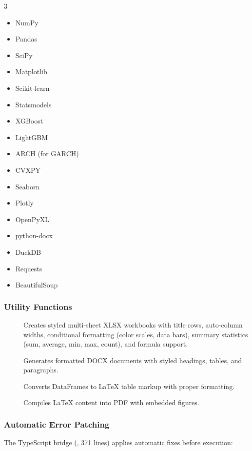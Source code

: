 \begin{multicols}{3}
\begin{itemize}
  \item NumPy
  \item Pandas
  \item SciPy
  \item Matplotlib
  \item Scikit-learn
  \item Statsmodels
  \item XGBoost
  \item LightGBM
  \item ARCH (for GARCH)
  \item CVXPY
  \item Seaborn
  \item Plotly
  \item OpenPyXL
  \item python-docx
  \item DuckDB
  \item Requests
  \item BeautifulSoup
\end{itemize}
\end{multicols}

\subsubsection{Utility Functions}

\begin{description}
  \item[] Creates styled multi-sheet XLSX workbooks with title rows, auto-column widths, conditional formatting (color scales, data bars), summary statistics (sum, average, min, max, count), and formula support.
  \item[] Generates formatted DOCX documents with styled headings, tables, and paragraphs.
  \item[] Converts DataFrames to \LaTeX{} table markup with proper formatting.
  \item[] Compiles \LaTeX{} content into PDF with embedded figures.
\end{description}

\subsubsection{Automatic Error Patching}

The TypeScript bridge (, 371 lines) applies automatic fixes before execution:

